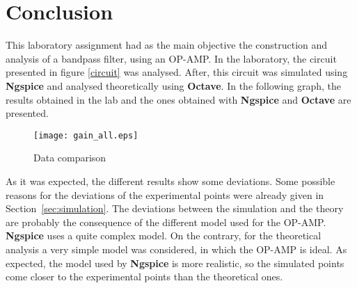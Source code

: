 \newpage

\section{Conclusion}
\label{sec:conclusion}


This laboratory assignment had as the main objective the construction and analysis of a bandpass filter, using an OP-AMP. In the laboratory, the circuit presented in figure \ref{circuit} was analysed. After, this circuit was simulated using {\bf Ngspice} and analysed theoretically using {\bf Octave}. In the following graph, the results obtained in the lab and the ones obtained with {\bf Ngspice} and {\bf Octave} are presented.

\begin{figure}[H]
        \centering
        \texttt{[image: gain\_all.eps]}
        \caption{Data comparison}
        \label{alldata}
\end{figure}

As it was expected, the different results show some deviations. Some possible reasons for the deviations of the experimental points were already given in Section~\ref{sec:simulation}. The deviations between the simulation and the theory are probably the consequence of the different model used for the OP-AMP. {\bf Ngspice} uses a quite complex model. On the contrary, for the theoretical analysis a very simple model was considered, in which the OP-AMP is ideal. As expected, the model used by {\bf Ngspice} is more realistic, so the simulated points come closer to the experimental points than the theoretical ones.

